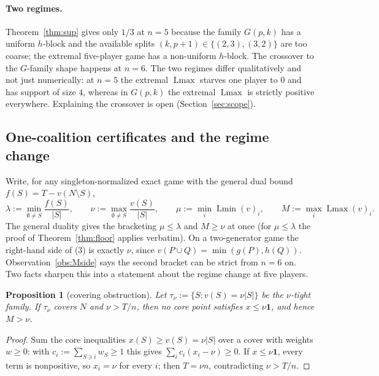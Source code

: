 \documentclass[11pt]{article}
\newtheorem{proposition}[theorem]{Proposition}
\newcommand{\Lmin}{\operatorname{Lmin}}
\newcommand{\Lmax}{\operatorname{Lmax}}
\newcommand{\one}{\mathbf 1}
\begin{document}
\paragraph{Two regimes.}
Theorem~\ref{thm:sup} gives only $1/3$ at $n=5$ because the family $G(p,k)$
has a uniform $h$-block and the available splits $(k,p+1)\in\{(2,3),(3,2)\}$
are too coarse; the extremal five-player game has a non-uniform $h$-block.
The crossover to the $G$-family shape happens at $n=6$.  The two regimes
differ qualitatively and not just numerically: at $n=5$ the extremal $\Lmax$
starves one player to $0$ and has support of size $4$, whereas in $G(p,k)$
the extremal $\Lmax$ is strictly positive everywhere.  Explaining the
crossover is open (Section~\ref{sec:scope}).


\subsection{One-coalition certificates and the regime change}
\label{sec:n5closed}

Write, for any singleton-normalized exact game with the general dual bound
$f(S)=T-v(N\setminus S)$,
\[
 \lambda:=\min_{\emptyset\ne S}\frac{f(S)}{|S|},\qquad
 \nu:=\max_{\emptyset\ne S}\frac{v(S)}{|S|},\qquad
 \mu:=\min_i\Lmin(v)_i,\qquad M:=\max_i\Lmax(v)_i .
\]
The general duality gives the bracketing $\mu\le\lambda$ and $M\ge\nu$
at once (for $\mu\le\lambda$ the proof of Theorem~\ref{thm:floor} applies
verbatim).  On a two-generator game the right-hand side of (3) is exactly
$\nu$, since $v(P\cup Q)=\min(g(P),h(Q))$.  Observation~\ref{obs:Mside} says the second bracket can be
strict from $n=6$ on.  Two facts sharpen this into a statement about the
regime change at five players.

\begin{proposition}[covering obstruction]\label{prop:cover}
Let $\tau_\nu:=\{S:v(S)=\nu|S|\}$ be the $\nu$-tight family.  If $\tau_\nu$
covers $N$ and $\nu>T/n$, then no core point satisfies $x\le\nu\one$, and
hence $M>\nu$.
\end{proposition}

\begin{proof}
Sum the core inequalities $x(S)\ge v(S)=\nu|S|$ over a cover with weights
$w\ge0$: with $c_i:=\sum_{S\ni i}w_S\ge1$ this gives
$\sum_ic_i(x_i-\nu)\ge0$.  If $x\le\nu\one$, every term is nonpositive, so
$x_i=\nu$ for every $i$; then $T=\nu n$, contradicting $\nu>T/n$.
\end{proof}
\end{document}
